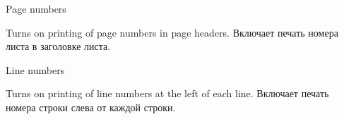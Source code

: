 \begin{popup}
\caption{Page numbers}
\ifenglish
Turns on printing of page numbers in page headers.
\else
Включает печать номера листа в заголовке листа.
\fi
\end{popup}

\begin{popup}
\caption{Line numbers}
\ifenglish
Turns on printing of line numbers at the left of each line.
\else
Включает печать номера строки слева от каждой строки.
\fi
\end{popup}

